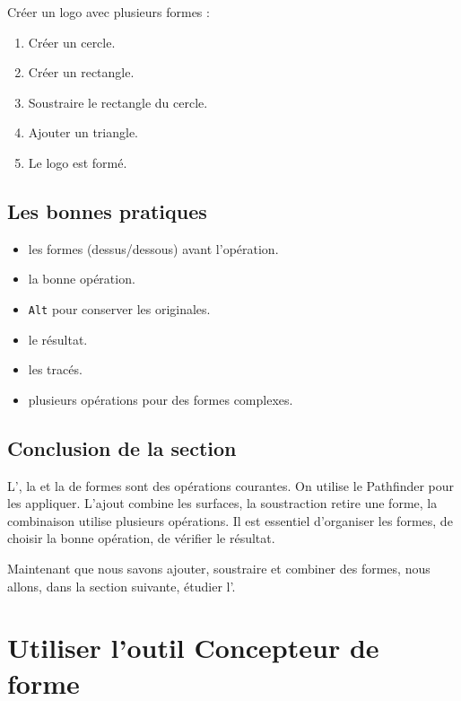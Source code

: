 Créer un logo avec plusieurs formes :

\begin{enumerate}
    \item Créer un cercle.
    \item Créer un rectangle.
    \item Soustraire le rectangle du cercle.
    \item Ajouter un triangle.
    \item Le logo est formé.
\end{enumerate}

\subsection{Les bonnes pratiques}

\begin{itemize}
    \item {} les formes (dessus/dessous) avant l'opération.
    \item {} la bonne opération.
    \item {} \texttt{Alt} pour conserver les originales.
    \item {} le résultat.
    \item {} les tracés.
    \item {} plusieurs opérations pour des formes complexes.
\end{itemize}

\subsection*{Conclusion de la section}

L', la  et la  de formes sont des opérations courantes. On utilise le Pathfinder pour les appliquer. L'ajout combine les surfaces, la soustraction retire une forme, la combinaison utilise plusieurs opérations. Il est essentiel d'organiser les formes, de choisir la bonne opération, de vérifier le résultat.

Maintenant que nous savons ajouter, soustraire et combiner des formes, nous allons, dans la section suivante, étudier l'.

\section{Utiliser l'outil Concepteur de forme}

